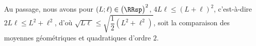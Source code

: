 \begin{remark}
	Au passage, nous avons pour $(L ; \ell) \in \big( \RRsp \big)^2$, $4 L \ell \leq (L + \ell)^2$, c'est-à-dire $2 L \ell \leq L^2 + \ell^2$, d'où $\sqrt{L \ell} \leq \sqrt{\dfrac12 (L^2 + \ell^2)}$, soit la comparaison des moyennes géométriques et quadratiques d'ordre $2$.
\end{remark}
